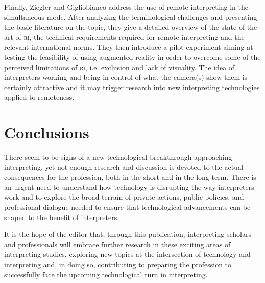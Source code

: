 \documentclass[output=paper]{langsci/langscibook}
\begin{document}
Finally, Ziegler and Gigliobianco address the use of remote interpreting in the simultaneous mode. After analyzing the terminological challenges and presenting the basic literature on the topic, they give a detailed overview of the state-of-the art of \textsc{ri}, the technical requirements required for remote interpreting and the relevant international norms. They then introduce a pilot experiment aiming at testing the feasibility of using augmented reality in order to overcome some of the perceived limitations of \textsc{ri}, i.e. exclusion and lack of visuality. The idea of interpreters working and being in control of what the camera(s) show them is certainly attractive and it may trigger research into new interpreting technologies applied to remoteness. 
 
\section{Conclusions} 
 
There seem to be signs of a new technological breakthrough approaching interpreting, yet not enough research and discussion is devoted to the actual consequences for the profession, both in the short and in the long term. There is an urgent need to understand how technology is disrupting the way interpreters work and to explore the broad terrain of private actions, public policies, and professional dialogue needed to ensure that technological advancements can be shaped to the benefit of interpreters. 

It is the hope of the editor that, through this publication, interpreting scholars and professionals will embrace further research in these exciting areas of interpreting studies, exploring new topics at the intersection of technology and interpreting and, in doing so, contributing to preparing the profession to successfully face the upcoming technological turn in interpreting. 





\sloppy
\printbibliography[heading=subbibliography,notkeyword=this]
\end{document}
